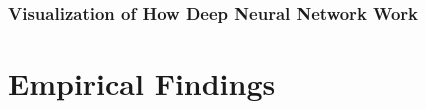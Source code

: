 \documentclass[12pt,letterpaper]{article}
\begin{document}
\subsubsection{Visualization of How Deep Neural Network Work} 



















\section{Empirical Findings}


% 
\end{document}
